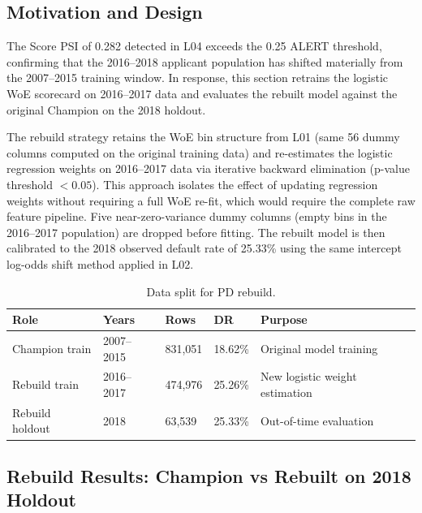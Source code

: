 \documentclass[12pt,a4paper]{report}
\begin{document}
\label{sec:l05rebuild}
\subsection{Motivation and Design}

The Score PSI of 0.282 detected in L04 exceeds the 0.25 ALERT threshold, confirming that the 2016--2018 applicant population has shifted materially from the 2007--2015 training window. In response, this section retrains the logistic WoE scorecard on 2016--2017 data and evaluates the rebuilt model against the original Champion on the 2018 holdout.

The rebuild strategy retains the WoE bin structure from L01 (same 56 dummy columns computed on the original training data) and re-estimates the logistic regression weights on 2016--2017 data via iterative backward elimination (p-value threshold $< 0.05$). This approach isolates the effect of updating regression weights without requiring a full WoE re-fit, which would require the complete raw feature pipeline. Five near-zero-variance dummy columns (empty bins in the 2016--2017 population) are dropped before fitting. The rebuilt model is then calibrated to the 2018 observed default rate of 25.33\% using the same intercept log-odds shift method applied in L02.

\begin{table}[H]
\centering
\caption{Data split for PD rebuild.}
\label{tab:rebuild_split}
\begin{tabular}{lllll}
\toprule
\textbf{Role} & \textbf{Years} & \textbf{Rows} & \textbf{DR} & \textbf{Purpose} \\
\midrule
Champion train  & 2007--2015 & 831,051  & 18.62\% & Original model training \\
Rebuild train   & 2016--2017 & 474,976  & 25.26\% & New logistic weight estimation \\
Rebuild holdout & 2018       & 63,539   & 25.33\% & Out-of-time evaluation \\
\bottomrule
\end{tabular}
\end{table}

\subsection{Rebuild Results: Champion vs Rebuilt on 2018 Holdout}
\end{document}
